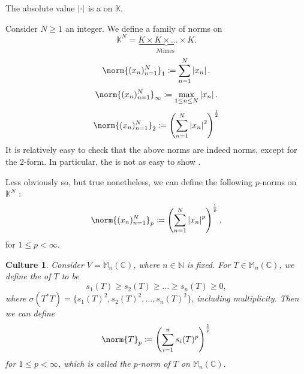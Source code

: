 \documentclass[notoc,notitlepage]{tufte-book}
\newtheorem*{culture}{Culture}
\begin{document}
\begin{eg}
  The absolute value $\left|\cdot\right|$ is a  on $\mathbb{K}$.
\end{eg}

\begin{eg}[$p$-norms]\label{eg:p_norms}
  Consider $N \geq 1$ an integer. We define a family of norms on 
  \begin{equation*}
    \mathbb{K}^N = \underbrace{K \times K \times \hdots \times K}_{N \text{
    times }}.
  \end{equation*}
  \begin{equation*}
    \norm{(x_n)_{n=1}^{N}}_{1} \coloneqq \sum_{n=1}^{N} \abs{x_n}.
  \end{equation*}
  \begin{equation*}
    \norm{(x_n)_{n=1}^{N}}_{\infty} \coloneqq \max_{1 \leq n \leq N} \abs{x_n}.
  \end{equation*}
  \begin{equation*}
    \norm{(x_n)_{n=1}^{N}}_2 \coloneqq \left( \sum_{n=1}^{N} \abs{x_n}^2
    \right)^{\frac{1}{2}}
  \end{equation*}
  It is relatively easy to check that the above norms are indeed norms, except
  for the $2$-form. In particular, the  is not as
  easy to show .

  Less obviously so, but true nonetheless, we can define the following $p$-norms
  on $\mathbb{K}^N$ :
  \begin{equation*}
    \norm{(x_n)_{n=1}^N}_p \coloneqq \left( \sum_{n=1}^{N} \abs{x_n}^p
    \right)^{\frac{1}{p}},
  \end{equation*}
  for $1 \leq p < \infty$.
\end{eg}

\begin{culture}
  Consider $V = \mathbb{M}_n(\mathbb{C})$,  where $n \in \mathbb{N}$ is fixed.
  For $T \in \mathbb{M}_n(\mathbb{C})$, we define the 
  of $T$ to be
  \begin{equation*}
    s_1(T) \geq s_2(T) \geq \hdots \geq s_n(T) \geq 0,
  \end{equation*}
  where $\sigma(T^* T) = \{ s_1(T)^2, s_2(T)^2, \ldots, s_n(T)^2 \}$, including
  multiplicity. Then we can define
  \begin{equation*}
    \norm{T}_p \coloneqq \left( \sum_{i=1}^{n} s_i(T)^p \right)^{\frac{1}{p}}
  \end{equation*}
  for $1 \leq p < \infty$, which is called the $p$-norm of $T$ on
  $\mathbb{M}_n(\mathbb{C})$.
\end{culture}
\end{document}
